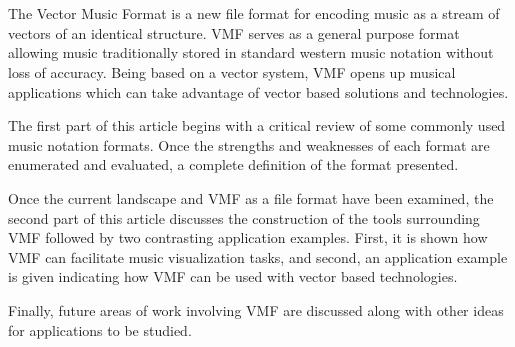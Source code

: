 
\section{}

The Vector Music Format is a new file format for encoding music as a stream of vectors of an identical structure. VMF serves as a general purpose format allowing music traditionally stored in standard western music notation without loss of accuracy. Being based on a vector system, VMF opens up musical applications which can take advantage of vector based solutions and technologies.

The first part of this article begins with a critical review of some commonly used music notation formats. Once the strengths and weaknesses of each format are enumerated and evaluated, a complete definition of the format presented. 

Once the current landscape and VMF as a file format have been examined, the second part of this article discusses the construction of the tools surrounding VMF followed by two contrasting application examples. First, it is shown how VMF can facilitate music visualization tasks, and second, an application example is given indicating how VMF can be used with vector based technologies.

Finally, future areas of work involving VMF are discussed along with other ideas for applications to be studied.